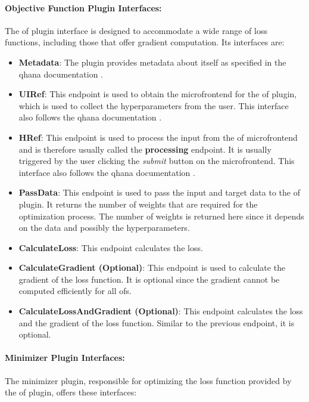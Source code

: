 \documentclass[
  a4paper,  %
  twoside,  %
  bibliography=totoc,
  headsepline,
  cleardoublepage=empty,
  parskip=half,
  draft=false
]{scrbook}
\begin{document}
\paragraph{Objective Function Plugin Interfaces:}

The \gls{of} plugin interface is designed to accommodate a wide range of loss functions, including those that offer gradient computation.
Its interfaces are:

\begin{itemize}
\item \textbf{Metadata}: The plugin provides metadata about itself as specified in the \gls{qhana} documentation \cite{FabianBuehler}.
\item \textbf{UIRef}: This endpoint is used to obtain the microfrontend for the \gls{of} plugin, which is used to collect the hyperparameters from the user.
This interface also follows the \gls{qhana} documentation \cite{FabianBuehler}.
\item \textbf{HRef}: This endpoint is used to process the input from the \gls{of} microfrontend and is therefore usually called the \textbf{processing} endpoint.
It is usually triggered by the user clicking the \emph{submit} button on the microfrontend.
This interface also follows the \gls{qhana} documentation \cite{FabianBuehler}.
\item \textbf{PassData}: This endpoint is used to pass the input and target data to the \gls{of} plugin.
It returns the number of weights that are required for the optimization process.
The number of weights is returned here since it depends on the data and possibly the hyperparameters.
\item \textbf{CalculateLoss}: This endpoint calculates the loss.
\item \textbf{CalculateGradient (Optional)}: This endpoint is used to calculate the gradient of the loss function. It is optional since the gradient cannot be computed efficiently for all \glspl{of}.
\item \textbf{CalculateLossAndGradient (Optional)}: This endpoint calculates the loss and the gradient of the loss function. Similar to the previous endpoint, it is optional.
\end{itemize}

\paragraph{Minimizer Plugin Interfaces:}

The minimizer plugin, responsible for optimizing the loss function provided by the \gls{of} plugin, offers these interfaces:
\end{document}
